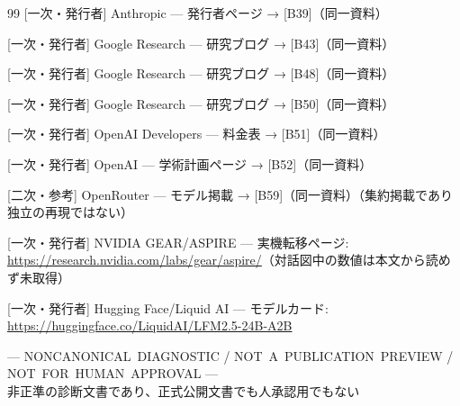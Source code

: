 \documentclass[lualatex,a4paper,10pt]{jlreq}
\begin{document}
\begin{thebibliography}{99}
 [一次・発行者] Anthropic — 発行者ページ → [B39]（同一資料）

 [一次・発行者] Google Research — 研究ブログ → [B43]（同一資料）

 [一次・発行者] Google Research — 研究ブログ → [B48]（同一資料）

 [一次・発行者] Google Research — 研究ブログ → [B50]（同一資料）

 [一次・発行者] OpenAI Developers — 料金表 → [B51]（同一資料）

 [一次・発行者] OpenAI — 学術計画ページ → [B52]（同一資料）

 [二次・参考] OpenRouter — モデル掲載 → [B59]（同一資料）（集約掲載であり独立の再現ではない）

 [一次・発行者] NVIDIA GEAR/ASPIRE — 実機転移ページ: \url{https://research.nvidia.com/labs/gear/aspire/}（対話図中の数値は本文から読めず未取得）

 [一次・発行者] Hugging Face/Liquid AI — モデルカード: \url{https://huggingface.co/LiquidAI/LFM2.5-24B-A2B}

\end{thebibliography}

\begin{center}\color{SurveyMuted}--- \mbox{NONCANONICAL DIAGNOSTIC} / \mbox{NOT A PUBLICATION PREVIEW} / \mbox{NOT FOR HUMAN APPROVAL} ---\\{\footnotesize 非正準の診断文書であり、正式公開文書でも人承認用でもない}\end{center}
\end{document}
